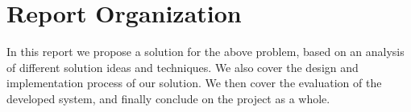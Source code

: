
\section{Report Organization}
In this report we propose a solution for the above problem, based on an analysis of different solution ideas and techniques. We also cover the design and implementation process of our solution. We then cover the evaluation of the developed system, and finally conclude on the project as a whole. 

